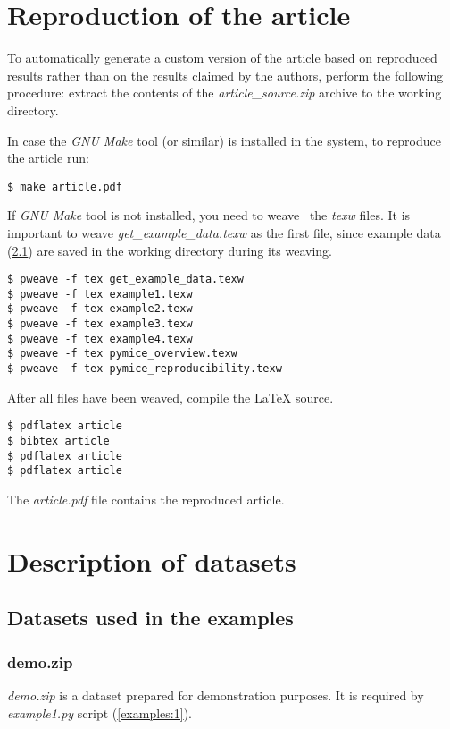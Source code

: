 \section{Reproduction of the article}
\label{reproduction}
To automatically generate a custom version of the article based on reproduced
results rather than on the results claimed by the authors, perform the following
procedure: extract the contents of the
\emph{article\_source.zip} archive to the working directory.

In case the \emph{GNU Make} tool (or similar) is installed in the system, to
reproduce the article run:
\begin{verbatim}
$ make article.pdf
\end{verbatim}

If \emph{GNU Make} tool is not installed, you need to weave~\cite{literateProgramming}
the \emph{texw} files.
It is important to weave \emph{get\_example\_data.texw} as the first file,
since example data (\ref{data:examples}) are saved in the working directory
during its weaving.

\begin{verbatim}
$ pweave -f tex get_example_data.texw
$ pweave -f tex example1.texw
$ pweave -f tex example2.texw
$ pweave -f tex example3.texw
$ pweave -f tex example4.texw
$ pweave -f tex pymice_overview.texw
$ pweave -f tex pymice_reproducibility.texw
\end{verbatim}

After all files have been weaved, compile the \LaTeX{} source.

\begin{verbatim}
$ pdflatex article
$ bibtex article
$ pdflatex article
$ pdflatex article
\end{verbatim}

The \emph{article.pdf} file contains the reproduced article.


\section{Description of datasets}
\subsection{Datasets used in the examples}
\label{data:examples}


\subsubsection{demo.zip}
\label{data:examples:demo}
\emph{demo.zip} is a dataset prepared for demonstration purposes.
It is required by \emph{example1.py} script (\ref{examples:1}).


